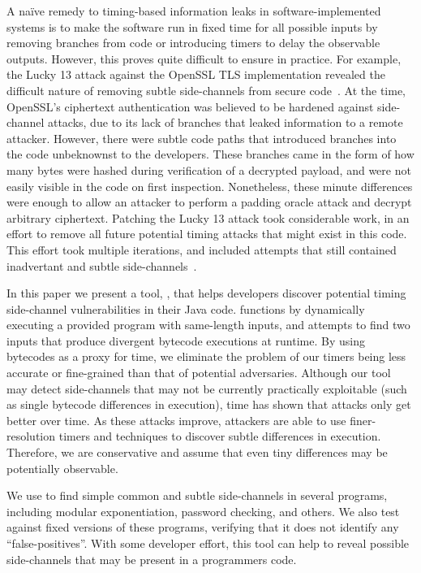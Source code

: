 A na\"ive remedy to timing-based information leaks in software-implemented
systems is to make the software run in fixed time for all possible inputs by
removing branches from code or
introducing timers to delay the observable outputs. 
However, this proves quite difficult to ensure in practice. For example, the Lucky 13
attack against the OpenSSL TLS implementation revealed the difficult nature of
removing subtle side-channels from secure code~\cite{al2013lucky}. At the time, OpenSSL's
ciphertext authentication was believed to be hardened against
side-channel attacks, due to its lack of branches that leaked information to a
remote attacker. However, there were subtle code paths that introduced branches
into the code unbeknownst to the developers. These branches came in the form of
how many bytes were hashed during verification of a decrypted payload, and were not easily
visible in the code on first inspection. Nonetheless, these minute differences
were enough to allow an attacker to perform a padding oracle attack and decrypt
arbitrary ciphertext. Patching the Lucky 13 attack took considerable work, in an
effort to remove all future potential timing attacks that might exist in this
code. This effort took multiple iterations, and included attempts that still
contained inadvertant and subtle side-channels~\cite{agl-lucky13}.

In this paper we present a tool, \jcupid, that helps developers discover
potential timing side-channel vulnerabilities in their Java code. \jcupid
functions by dynamically executing a provided program with same-length inputs,
and attempts to find two inputs that produce divergent bytecode executions at
runtime. By using bytecodes as a proxy for time, we eliminate the problem of
our timers being less accurate or fine-grained than that of potential
adversaries. Although our tool may detect side-channels that may not be currently
practically exploitable (such as single bytecode differences in execution), time has shown
that attacks only get better over time. As these attacks improve, attackers are
able to use finer-resolution timers and techniques to discover subtle
differences in execution. Therefore, we are conservative and assume that even
tiny differences may be potentially observable.

We use \jcupid to find simple common and subtle side-channels in several
programs, including modular exponentiation, password checking, and others. We
also test \jcupid against fixed versions of these programs, verifying that it
does not identify any ``false-positives''. With some developer effort, this tool
can help to reveal possible side-channels that may be present in a programmers
code.

